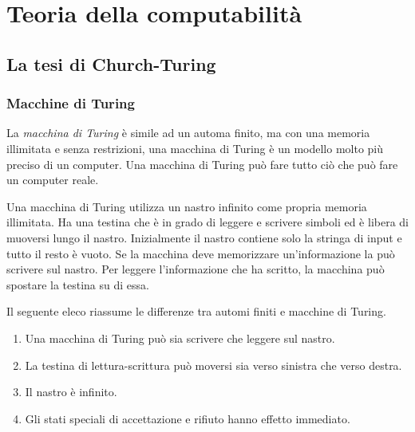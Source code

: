 \documentclass[12pt]{report}
\begin{document}
\part{Teoria della computabilità}
\chapter{La tesi di Church-Turing}
\section{Macchine di Turing}
	La \textit{macchina di Turing} è simile ad un automa finito, ma con una memoria illimitata e senza restrizioni, una macchina di Turing è un modello molto più preciso di un computer. Una macchina di Turing può fare tutto ciò che può fare un computer reale.

	Una macchina di Turing utilizza un nastro infinito come propria memoria illimitata. Ha una testina che è in grado di leggere e scrivere simboli ed è libera di muoversi lungo il nastro. Inizialmente il nastro contiene solo la stringa di input e tutto il resto è vuoto. Se la macchina deve memorizzare un'informazione la può scrivere sul nastro. Per leggere l'informazione che ha scritto, la macchina può spostare la testina su di essa.

	Il seguente eleco riassume le differenze tra automi finiti e macchine di Turing.
	\begin{enumerate}
		\item Una macchina di Turing può sia scrivere che leggere sul nastro.
		\item La testina di lettura-scrittura può moversi sia verso sinistra che verso destra.
		\item Il nastro è infinito.
		\item Gli stati speciali di accettazione e rifiuto hanno effetto immediato.
	\end{enumerate}
\end{document}
